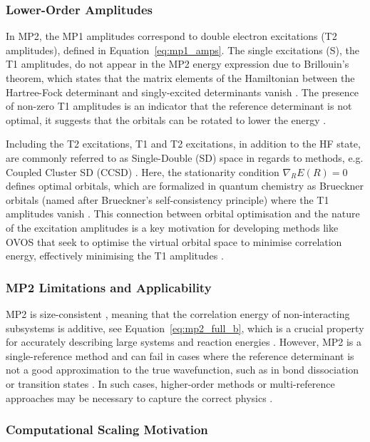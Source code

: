 \subsubsection{Lower-Order Amplitudes}

In MP2, the MP1 amplitudes correspond to double electron excitations (T2 amplitudes), defined in Equation~\ref{eq:mp1_amps}. The single excitations (S), the T1 amplitudes, do not appear in the MP2 energy expression due to Brillouin's theorem, which states that the matrix elements of the Hamiltonian between the Hartree-Fock determinant and singly-excited determinants vanish \cite{Helgaker2000}. The presence of non-zero T1 amplitudes is an indicator that the reference determinant is not optimal, it suggests that the orbitals can be rotated to lower the energy \cite{Lee2018, Handy1989}.

Including the T2 excitations, T1 and T2 excitations, in addition to the HF state, are commonly referred to as Single-Double (SD) space in regards to methods, e.g. Coupled Cluster SD (CCSD) \cite{Helgaker2000}. Here, the stationarity condition $\nabla_R E(R) = 0$ defines optimal orbitals, which are formalized in quantum chemistry as Brueckner orbitals (named after Brueckner's self-consistency principle) where the T1 amplitudes vanish \cite{Brueckner1954}. This connection between orbital optimisation and the nature of the excitation amplitudes is a key motivation for developing methods like OVOS that seek to optimise the virtual orbital space to minimise correlation energy, effectively minimising the T1 amplitudes \cite{Adamowicz1987}.

\subsubsection{MP2 Limitations and Applicability}

MP2 is size-consistent \cite{Helgaker2000}, meaning that the correlation energy of non-interacting subsystems is additive, see Equation~\ref{eq:mp2_full_b}, which is a crucial property for accurately describing large systems and reaction energies \cite{Jensen2017}. However, MP2 is a single-reference method and can fail in cases where the reference determinant is not a good approximation to the true wavefunction, such as in bond dissociation or transition states  \cite{Helgaker2000, Cao2019}. In such cases, higher-order methods or multi-reference approaches may be necessary to capture the correct physics \cite{Sherrill1999}.

\subsubsection{Computational Scaling Motivation}

